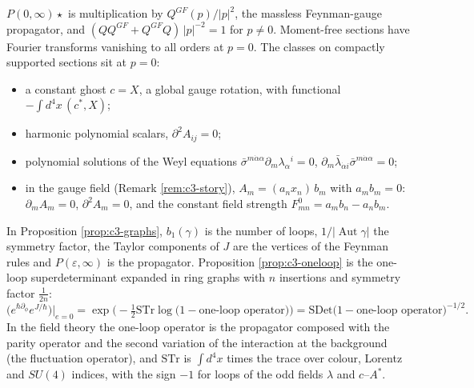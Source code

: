 \begin{remark}
$P(0,\infty)\star$ is multiplication by $Q^{GF}(p)/|p|^2$, the massless Feynman-gauge propagator, and $(QQ^{GF}+Q^{GF}Q)\,|p|^{-2}=1$ for $p\neq0$. Moment-free sections have Fourier transforms vanishing to all orders at $p=0$. The classes on compactly supported sections sit at $p=0$:
\begin{itemize}
\item a constant ghost $c=X$, a global gauge rotation, with functional $-\int d^4x\,(c^*,X)$;
\item harmonic polynomial scalars, $\partial^2A_{ij}=0$;
\item polynomial solutions of the Weyl equations $\bar\sigma^{m\dot\alpha\alpha}\partial_m\lambda_\alpha{}^i=0$, $\partial_m\bar\lambda_{\dot\alpha i}\bar\sigma^{m\dot\alpha\alpha}=0$;
\item in the gauge field (Remark \ref{rem:c3-story}), $A_m=(a_nx_n)\,b_m$ with $a_mb_m=0$: $\partial_mA_m=0$, $\partial^2A_m=0$, and the constant field strength $F^0_{mn}=a_mb_n-a_nb_m$.
\end{itemize}
\end{remark}

\begin{remark}
In Proposition \ref{prop:c3-graphs}, $b_1(\gamma)$ is the number of loops, $1/|\operatorname{Aut}\gamma|$ the symmetry factor, the Taylor components of $J$ are the vertices of the Feynman rules and $P(\varepsilon,\infty)$ is the propagator. Proposition \ref{prop:c3-oneloop} is the one-loop superdeterminant expanded in ring graphs with $n$ insertions and symmetry factor $\frac1{2n}$:
\[
\big(e^{\hbar\partial_\phi}e^{J/\hbar}\big)\big|_{e=0}=\exp\Big(-\tfrac12\mathrm{STr}\log\big(1-\text{one-loop operator}\big)\Big)=\mathrm{SDet}\big(1-\text{one-loop operator}\big)^{-1/2}.
\]
In the field theory the one-loop operator is the propagator composed with the parity operator and the second variation of the interaction at the background (the fluctuation operator), and $\mathrm{STr}$ is $\int d^4x$ times the trace over colour, Lorentz and $SU(4)$ indices, with the sign $-1$ for loops of the odd fields $\lambda$ and $c$--$A^*$.
\end{remark}

